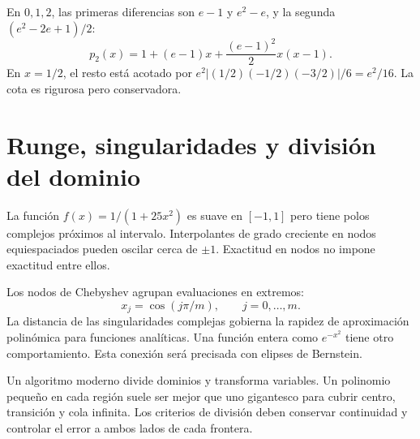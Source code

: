 \documentclass[11pt,a4paper]{article}
\theoremstyle{definition}
\begin{document}
\begin{ejemplo}
En $0,1,2$, las primeras diferencias son $e-1$ y $e^2-e$, y la segunda $(e^2-2e+1)/2$:
\[
p_2(x)=1+(e-1)x+\frac{(e-1)^2}2x(x-1).
\]
En $x=1/2$, el resto está acotado por
$e^2|(1/2)(-1/2)(-3/2)|/6=e^2/16$. La cota es rigurosa pero conservadora.
\end{ejemplo}

\section{Runge, singularidades y división del dominio}
La función $f(x)=1/(1+25x^2)$ es suave en $[-1,1]$ pero tiene polos complejos próximos al intervalo. Interpolantes de grado creciente en nodos equiespaciados pueden oscilar cerca de $\pm1$. Exactitud en nodos no impone exactitud entre ellos.

Los nodos de Chebyshev agrupan evaluaciones en extremos:
\[
x_j=\cos(j\pi/m),\qquad j=0,\ldots,m.
\]
La distancia de las singularidades complejas gobierna la rapidez de aproximación polinómica para funciones analíticas. Una función entera como $e^{-x^2}$ tiene otro comportamiento. Esta conexión será precisada con elipses de Bernstein.

Un algoritmo moderno divide dominios y transforma variables. Un polinomio pequeño en cada región suele ser mejor que uno gigantesco para cubrir centro, transición y cola infinita. Los criterios de división deben conservar continuidad y controlar el error a ambos lados de cada frontera.
\end{document}
